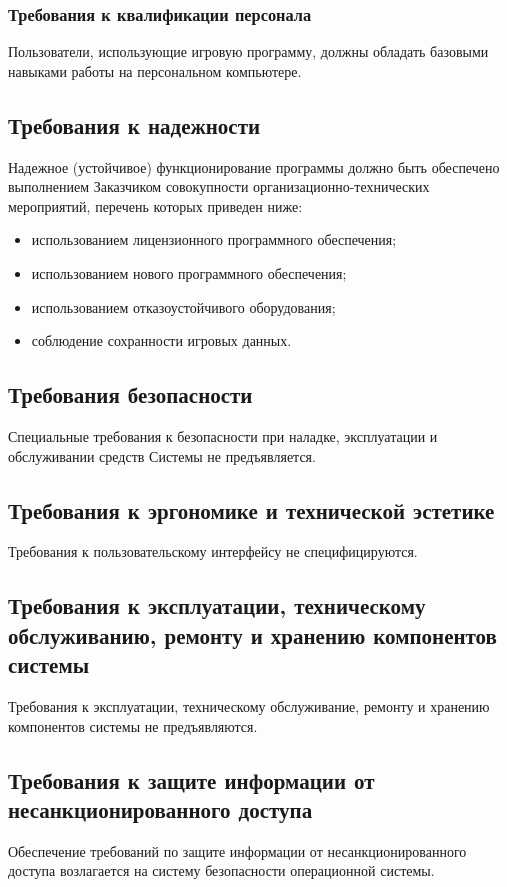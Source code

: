 \subsubsection{Требования к квалификации персонала}
Пользователи, использующие игровую программу, должны обладать базовыми навыками работы на 
персональном компьютере.

\subsection{Требования к надежности}
Надежное (устойчивое) функционирование программы должно быть обеспечено выполнением 
Заказчиком совокупности организационно-технических мероприятий, перечень которых приведен 
ниже: 
\begin{itemize}
    \item использованием лицензионного программного обеспечения; 
    \item использованием нового программного обеспечения;
    \item использованием отказоустойчивого оборудования;
    \item соблюдение сохранности игровых данных.
\end{itemize}

\subsection{Требования безопасности}
Специальные требования к безопасности при наладке, эксплуатации и обслуживании средств 
Системы не предъявляется.

\subsection{Требования к эргономике и технической эстетике}
Требования к пользовательскому интерфейсу не специфицируются.

\subsection{Требования к эксплуатации, техническому обслуживанию, ремонту и хранению компонентов 
    системы}
Требования к эксплуатации, техническому обслуживание, ремонту и хранению компонентов системы 
не предъявляются.

\subsection{Требования к защите информации от несанкционированного доступа}
Обеспечение требований по защите информации от несанкционированного доступа возлагается на 
систему безопасности операционной системы.

